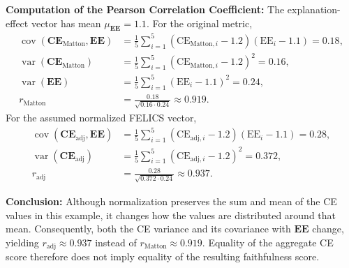 \begin{example_box}[label=ex:payout_normalization_correlation_unused]
    \smallskip
    \textbf{Computation of the Pearson Correlation Coefficient:} The explanation-effect vector has mean $\mu_{\mathbf{EE}}=1.1$. For the original metric,
    \begin{align}
        \operatorname{cov}(\mathbf{CE}_{\mathrm{Matton}}, \mathbf{EE}) & = \frac{1}{5}\sum_{i=1}^5 (\mathrm{CE}_{\mathrm{Matton},i} - 1.2)(\mathrm{EE}_i - 1.1) = 0.18, \\
        \operatorname{var}(\mathbf{CE}_{\mathrm{Matton}})              & = \frac{1}{5}\sum_{i=1}^5 (\mathrm{CE}_{\mathrm{Matton},i} - 1.2)^2 = 0.16, \\
        \operatorname{var}(\mathbf{EE})                                 & = \frac{1}{5}\sum_{i=1}^5 (\mathrm{EE}_i - 1.1)^2 = 0.24, \\
        r_{\mathrm{Matton}}                                  & = \frac{0.18}{\sqrt{0.16 \cdot 0.24}} \approx 0.919.
    \end{align}
    For the assumed normalized FELICS vector,
    \begin{align}
        \operatorname{cov}(\mathbf{CE}_{\mathrm{adj}}, \mathbf{EE}) & = \frac{1}{5}\sum_{i=1}^5 (\mathrm{CE}_{\mathrm{adj},i} - 1.2)(\mathrm{EE}_i - 1.1) = 0.28, \\
        \operatorname{var}(\mathbf{CE}_{\mathrm{adj}})              & = \frac{1}{5}\sum_{i=1}^5 (\mathrm{CE}_{\mathrm{adj},i} - 1.2)^2 = 0.372, \\
        r_{\mathrm{adj}}                                 & = \frac{0.28}{\sqrt{0.372 \cdot 0.24}} \approx 0.937.
    \end{align}

    \smallskip
    \textbf{Conclusion:} Although normalization preserves the sum and mean of the CE values in this example, it changes how the values are distributed around that mean. Consequently, both the CE variance and its covariance with $\mathbf{EE}$ change, yielding $r_{\mathrm{adj}}\approx0.937$ instead of $r_{\mathrm{Matton}}\approx0.919$. Equality of the aggregate CE score therefore does not imply equality of the resulting faithfulness score.
\end{example_box}

